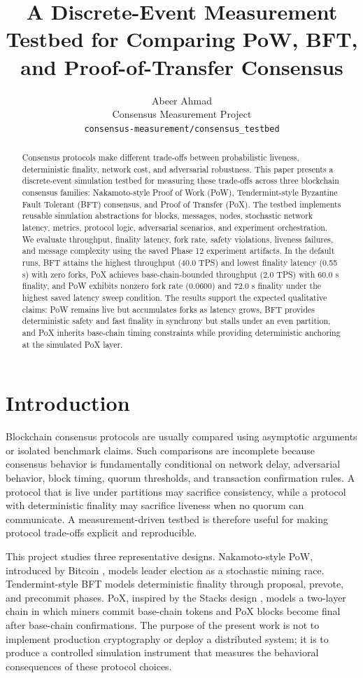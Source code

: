 \documentclass[11pt]{article}
\title{A Discrete-Event Measurement Testbed for Comparing PoW, BFT, and Proof-of-Transfer Consensus}
\author{Abeer Ahmad\\
Consensus Measurement Project\\
\texttt{consensus-measurement/consensus\_testbed}}
\date{}
\begin{document}
\maketitle

\begin{abstract}
Consensus protocols make different trade-offs between probabilistic liveness, deterministic finality, network cost, and adversarial robustness. This paper presents a discrete-event simulation testbed for measuring these trade-offs across three blockchain consensus families: Nakamoto-style Proof of Work (PoW), Tendermint-style Byzantine Fault Tolerant (BFT) consensus, and Proof of Transfer (PoX). The testbed implements reusable simulation abstractions for blocks, messages, nodes, stochastic network latency, metrics, protocol logic, adversarial scenarios, and experiment orchestration. We evaluate throughput, finality latency, fork rate, safety violations, liveness failures, and message complexity using the saved Phase 12 experiment artifacts. In the default runs, BFT attains the highest throughput (40.0 TPS) and lowest finality latency (0.55 s) with zero forks, PoX achieves base-chain-bounded throughput (2.0 TPS) with 60.0 s finality, and PoW exhibits nonzero fork rate (0.0600) and 72.0 s finality under the highest saved latency sweep condition. The results support the expected qualitative claims: PoW remains live but accumulates forks as latency grows, BFT provides deterministic safety and fast finality in synchrony but stalls under an even partition, and PoX inherits base-chain timing constraints while providing deterministic anchoring at the simulated PoX layer.
\end{abstract}

\section{Introduction}

Blockchain consensus protocols are usually compared using asymptotic arguments or isolated benchmark claims. Such comparisons are incomplete because consensus behavior is fundamentally conditional on network delay, adversarial behavior, block timing, quorum thresholds, and transaction confirmation rules. A protocol that is live under partitions may sacrifice consistency, while a protocol with deterministic finality may sacrifice liveness when no quorum can communicate. A measurement-driven testbed is therefore useful for making protocol trade-offs explicit and reproducible.

This project studies three representative designs. Nakamoto-style PoW, introduced by Bitcoin \cite{nakamoto2008bitcoin}, models leader election as a stochastic mining race. Tendermint-style BFT \cite{kwon2014tendermint,buchman2016tendermint} models deterministic finality through proposal, prevote, and precommit phases. PoX, inspired by the Stacks design \cite{ali2020stacks}, models a two-layer chain in which miners commit base-chain tokens and PoX blocks become final after base-chain confirmations. The purpose of the present work is not to implement production cryptography or deploy a distributed system; it is to produce a controlled simulation instrument that measures the behavioral consequences of these protocol choices.
\end{document}
